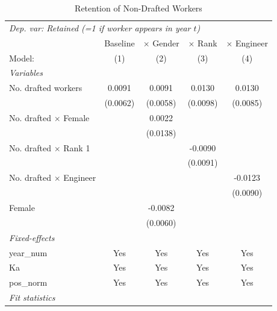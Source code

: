 \begin{table}[htbp]
\centering
\caption{Retention of Non-Drafted Workers}
\label{tab:retention}
\begin{threeparttable}
\begin{tabular}{lcccc}
   \tabularnewline \midrule \midrule
\multicolumn{5}{l}{\textit{Dep. var: Retained (=1 if worker appears in year $t$)}} \\
                                  & Baseline & $\times$ Gender  & $\times$ Rank  & $\times$ Engineer \\    
   Model:                         & (1)      & (2)              & (3)            & (4)\\  
   \midrule
   \emph{Variables}\\
   No. drafted workers            & 0.0091   & 0.0091           & 0.0130         & 0.0130\\   
                                  & (0.0062) & (0.0058)         & (0.0098)       & (0.0085)\\   
   No. drafted $\times$ Female    &          & 0.0022           &                &   \\   
                                  &          & (0.0138)         &                &   \\   
   No. drafted $\times$ Rank 1    &          &                  & -0.0090        &   \\   
                                  &          &                  & (0.0091)       &   \\   
   No. drafted $\times$ Engineer  &          &                  &                & -0.0123\\   
                                  &          &                  &                & (0.0090)\\   
   Female                         &          & -0.0082          &                &   \\   
                                  &          & (0.0060)         &                &   \\   
   \midrule
   \emph{Fixed-effects}\\
   year\_num                      & Yes      & Yes              & Yes            & Yes\\  
   Ka                             & Yes      & Yes              & Yes            & Yes\\  
   pos\_norm                      & Yes      & Yes              & Yes            & Yes\\  
   \midrule
   \emph{Fit statistics}\\

\end{tabular}
\end{threeparttable}
\end{table}
